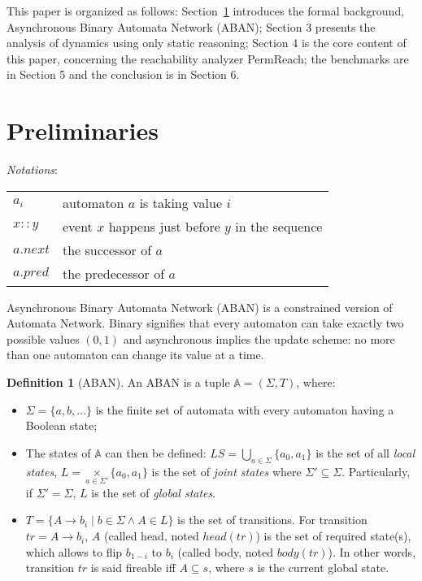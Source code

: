 \documentclass{article}
\theoremstyle{definition}
\newtheorem{definition}{Definition}
\begin{document}
This paper is organized as follows: Section~\ref{sect:preliminaries} introduces the formal background, Asynchronous Binary Automata Network (ABAN); Section 3 presents the analysis of dynamics using only static reasoning; 
Section 4 is the core content of this paper, concerning the reachability analyzer PermReach;
the benchmarks are in Section 5 and the conclusion is in Section 6.
\section{Preliminaries}\label{sect:preliminaries}
\textit{Notations}:

\begin{tabular}{l|l}
$a_i$& automaton $a$ is taking value $i$\\

$x::y$& event $x$ happens just before $y$ in the sequence\\

$a.next$& the successor of $a$\\ $a.pred$& the predecessor of $a$
\end{tabular}

Asynchronous Binary Automata Network (ABAN) is a constrained version of Automata Network.
Binary signifies that every automaton can take exactly two possible values $(0,1)$ and asynchronous implies the update scheme: no more than one automaton can change its value at a time. 

\begin{definition}[ABAN]\label{def:ABAN}
An ABAN is a tuple $\mathbb{A} = (\Sigma,T)$, where:
\begin{itemize}
\item $\Sigma=\{a,b,\ldots\}$ is the finite set of automata with every automaton having a Boolean state;
\item The states of $\mathbb{A}$ can then be defined: $LS= \underset{a\in \Sigma}{\bigcup} \{a_0,a_1\}$ is the set of all \textit{local states}, $L= \underset{a\in \Sigma'}{\times} \{a_0,a_1\}$ is the set of \textit{joint states} where $\Sigma'\subseteq\Sigma$. Particularly, if $\Sigma'=\Sigma$, $L$ is the set of \textit{global states}. 
\item $T= \{A\rightarrow b_i\mid b\in \Sigma \land A\in L\}$ is the set of transitions.
For transition $tr=A\to b_i$, $A$ (called head, noted $head(tr)$) is the set of required state(s), which allows to flip $b_{1-i}$ to $b_i$ (called body, noted $body(tr)$). In other words, transition $tr$ is said fireable iff $A\subseteq s$, where $s$ is the current global state. 
\end{itemize}
\end{definition}
\end{document}
